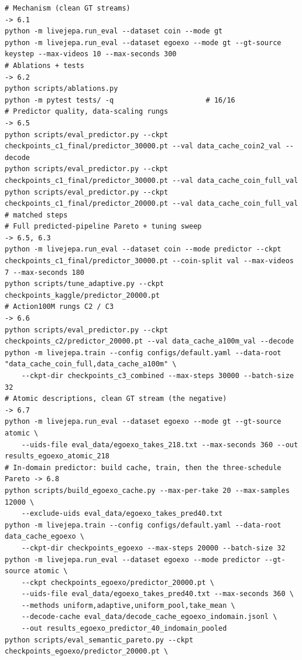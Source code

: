 \begin{lstlisting}
# Mechanism (clean GT streams)                                          -> 6.1
python -m livejepa.run_eval --dataset coin --mode gt
python -m livejepa.run_eval --dataset egoexo --mode gt --gt-source keystep --max-videos 10 --max-seconds 300
# Ablations + tests                                                     -> 6.2
python scripts/ablations.py
python -m pytest tests/ -q                      # 16/16
# Predictor quality, data-scaling rungs                                 -> 6.5
python scripts/eval_predictor.py --ckpt checkpoints_c1_final/predictor_30000.pt --val data_cache_coin2_val --decode
python scripts/eval_predictor.py --ckpt checkpoints_c1_final/predictor_30000.pt --val data_cache_coin_full_val
python scripts/eval_predictor.py --ckpt checkpoints_c1_final/predictor_20000.pt --val data_cache_coin_full_val  # matched steps
# Full predicted-pipeline Pareto + tuning sweep                         -> 6.5, 6.3
python -m livejepa.run_eval --dataset coin --mode predictor --ckpt checkpoints_c1_final/predictor_30000.pt --coin-split val --max-videos 7 --max-seconds 180
python scripts/tune_adaptive.py --ckpt checkpoints_kaggle/predictor_20000.pt
# Action100M rungs C2 / C3                                              -> 6.6
python scripts/eval_predictor.py --ckpt checkpoints_c2/predictor_20000.pt --val data_cache_a100m_val --decode
python -m livejepa.train --config configs/default.yaml --data-root "data_cache_coin_full,data_cache_a100m" \
    --ckpt-dir checkpoints_c3_combined --max-steps 30000 --batch-size 32
# Atomic descriptions, clean GT stream (the negative)                   -> 6.7
python -m livejepa.run_eval --dataset egoexo --mode gt --gt-source atomic \
    --uids-file eval_data/egoexo_takes_218.txt --max-seconds 360 --out results_egoexo_atomic_218
# In-domain predictor: build cache, train, then the three-schedule Pareto -> 6.8
python scripts/build_egoexo_cache.py --max-per-take 20 --max-samples 12000 \
    --exclude-uids eval_data/egoexo_takes_pred40.txt
python -m livejepa.train --config configs/default.yaml --data-root data_cache_egoexo \
    --ckpt-dir checkpoints_egoexo --max-steps 20000 --batch-size 32
python -m livejepa.run_eval --dataset egoexo --mode predictor --gt-source atomic \
    --ckpt checkpoints_egoexo/predictor_20000.pt \
    --uids-file eval_data/egoexo_takes_pred40.txt --max-seconds 360 \
    --methods uniform,adaptive,uniform_pool,take_mean \
    --decode-cache eval_data/decode_cache_egoexo_indomain.jsonl \
    --out results_egoexo_predictor_40_indomain_pooled
python scripts/eval_semantic_pareto.py --ckpt checkpoints_egoexo/predictor_20000.pt \

\end{lstlisting}
